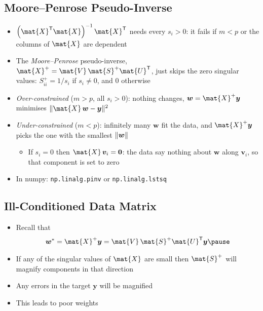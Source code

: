 \begin{slide}
\section[-2]{Moore--Penrose Pseudo-Inverse}

\begin{PauseHighLight}\squeeze
  \begin{itemize}
  \item $\left(\mat{X}^\tr\mat{X}\right)^{-1}\mat{X}^\tr$ needs every
    $s_i>0$: it fails if $m<p$ or the columns of $\mat{X}$ are
    dependent\pause
  \item The \emph{Moore--Penrose} pseudo-inverse,
    $\mat{X}^{+} = \mat{V}\,\mat{S}^{+}\mat{U}^\tr$, just skips the zero
    singular values: $S^{+}_{ii} = 1/s_i$ if $s_i\neq0$, and $0$
    otherwise\pause
  \item \emph{Over-constrained} ($m>p$, all $s_i>0$): nothing changes,
    $\bm{w} = \mat{X}^{+}\bm{y}$ minimises $\len{\mat{X}\,\bm{w}-\bm{y}}^2$\pause
  \item \emph{Under-constrained} ($m<p$): infinitely many $\bm{w}$ fit
    the data, and $\mat{X}^{+}\bm{y}$ picks the one with the smallest
    $\| \bm{w} \|$\pause
    \begin{itemize}
    \item If $s_i=0$ then $\mat{X}\,\bm{v}_i=\bm{0}$: the data say nothing
      about $\bm{w}$ along $\bm{v}_i$, so that component is set to
      zero\pause
    \end{itemize}
  \item In numpy: \texttt{np.linalg.pinv} or \texttt{np.linalg.lstsq}\pause
  \end{itemize}
\end{PauseHighLight}
\end{slide}


\begin{slide}
\section{Ill-Conditioned Data Matrix}

\begin{PauseHighLight}
  \begin{itemize}
  \item Recall that
    \begin{align*}
      \bm{w}^* = \mat{X}^{+} \bm{y} =  \mat{V}\,\mat{S}^{+} \mat{U}^\tr \bm{y}\pause
    \end{align*}
  \item If any of the singular values of $\mat{X}$ are small then
    $\mat{S}^{+}$ will magnify components in that direction\pause
  \item Any errors in the target $\bm{y}$ will be magnified\pause
  \item This leads to poor weights\pause
  \end{itemize}
\end{PauseHighLight}

\end{slide}

